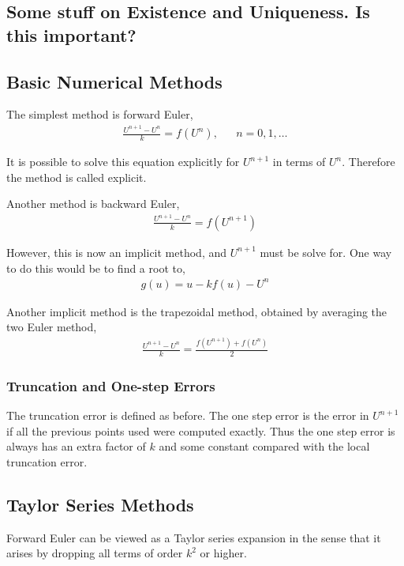 \documentclass[12pt]{article}
\begin{document}
\subsection{Some stuff on Existence and Uniqueness. Is this important?}


\subsection{Basic Numerical Methods}

The simplest method is forward Euler,
\begin{align*}
    \frac{U^{n+1}-U^n}{k} = f(U^n), && n=0,1,\ldots
\end{align*}

It is possible to solve this equation explicitly for \( U^{n+1} \) in terms of \( U^n \). Therefore the method is called explicit.

Another method is backward Euler,
\begin{align*}
    \frac{U^{n+1}-U^n}{k} = f(U^{n+1})
\end{align*}

However, this is now an implicit method, and \( U^{n+1} \) must be solve for. One way to do this would be to find a root to,
\begin{align*}
    g(u) = u - k f(u ) - U^n
\end{align*}

Another implicit method is the trapezoidal method, obtained by averaging the two Euler method,
\begin{align*}
    \frac{U^{n+1}-U^n}{k} = \frac{f(U^{n+1}) + f(U^n)}{2}
\end{align*}

\subsubsection{Truncation and One-step Errors}
The truncation error is defined as before. The one step error is the error in \( U^{n+1} \) if all the previous points used were computed exactly. Thus the one step error is always has an extra factor of \( k \) and some constant compared with the local truncation error.

\subsection{Taylor Series Methods}
Forward Euler can be viewed as a Taylor series expansion in the sense that it arises by dropping all terms of order \( k^2 \) or higher.
\end{document}
